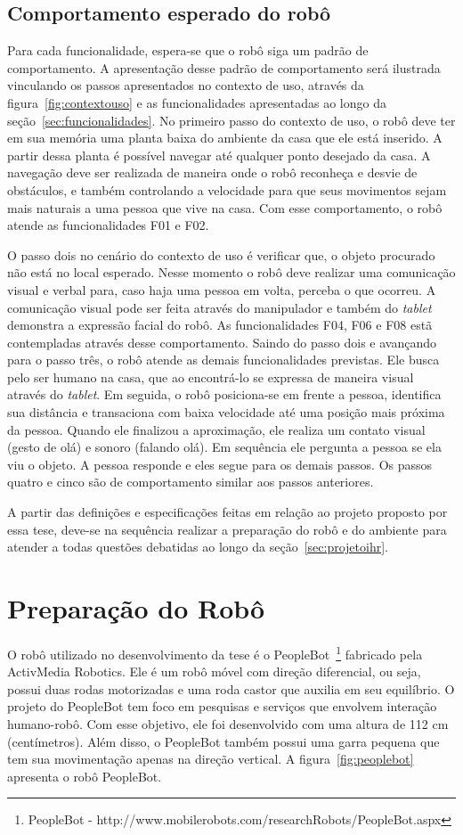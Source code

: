\subsection{Comportamento esperado do robô}
\label{sec:comportamentoesperado}
Para cada funcionalidade, espera-se que o robô siga um padrão de comportamento. A apresentação desse padrão de comportamento será ilustrada vinculando os passos apresentados no contexto de uso, através da figura~\ref{fig:contextouso} e as funcionalidades apresentadas ao longo da seção~\ref{sec:funcionalidades}. No primeiro passo do contexto de uso, o robô deve ter em sua memória uma planta baixa do ambiente da casa que ele está inserido. A partir dessa planta é possível navegar até qualquer ponto desejado da casa. A navegação deve ser realizada de maneira onde o robô reconheça e desvie de obstáculos, e também controlando a velocidade para que seus movimentos sejam mais naturais a uma pessoa que vive na casa. Com esse comportamento, o robô atende as funcionalidades F01 e F02.

O passo dois no cenário do contexto de uso é verificar que, o objeto procurado não está no local esperado. Nesse momento o robô deve realizar uma comunicação visual e verbal para, caso haja uma pessoa em volta, perceba o que ocorreu. A comunicação visual pode ser feita através do manipulador e também do \emph{tablet} demonstra a expressão facial do robô. As funcionalidades F04, F06 e F08 estã contempladas através desse comportamento. Saindo do passo dois e avançando para o passo três, o robô atende as demais funcionalidades previstas. Ele busca pelo ser humano na casa, que ao encontrá-lo se expressa de maneira visual através do \emph{tablet}. Em seguida, o robô posiciona-se em frente a pessoa, identifica sua distância e transaciona com baixa velocidade até uma posição mais próxima da pessoa. Quando ele finalizou a aproximação, ele realiza um contato visual (gesto de olá) e sonoro (falando olá). Em sequência ele pergunta a pessoa se ela viu o objeto. A pessoa responde e eles segue para os demais passos. Os passos quatro e cinco são de comportamento similar aos passos anteriores.

A partir das definições e especificações feitas em relação ao projeto proposto por essa tese, deve-se na sequência realizar a preparação do robô e do ambiente para atender a todas questões debatidas ao longo da seção~\ref{sec:projetoihr}.

\section{Preparação do Robô}
\label{sec:robo}
O robô utilizado no desenvolvimento da tese é o PeopleBot~\footnote{PeopleBot - http://www.mobilerobots.com/researchRobots/PeopleBot.aspx} fabricado pela ActivMedia Robotics. Ele é um robô móvel com direção diferencial, ou seja, possui duas rodas motorizadas e uma roda castor que auxilia em seu equilíbrio. O projeto do PeopleBot tem foco em pesquisas e serviços que envolvem interação humano-robô. Com esse objetivo, ele foi desenvolvido com uma altura de 112 cm (centímetros). Além disso, o PeopleBot também possui uma garra pequena que tem sua movimentação apenas na direção vertical. A figura~\ref{fig:peoplebot} apresenta o robô PeopleBot.

